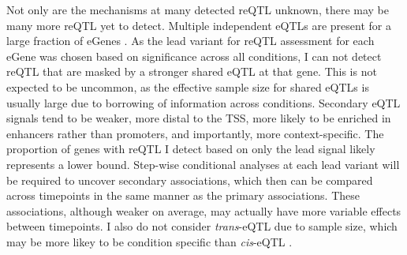 %

Not only are the mechanisms at many detected reQTL unknown, there may be many more reQTL yet to detect.
%
Multiple independent eQTLs are present for a large fraction of eGenes \autocite{zeng2019ComprehensiveMultipleEQTL}.
As the lead variant for reQTL assessment for each eGene was chosen based on significance across all conditions, I can not detect reQTL that are masked by a stronger shared eQTL at that gene.
This is not expected to be uncommon, as the effective sample size for shared eQTLs is usually large due to borrowing of information across conditions.
Secondary \gls{eQTL} signals tend to be weaker, more distal to the TSS, more likely to be enriched in enhancers rather than promoters, and importantly, more context-specific\autocite{vandiedonck2017GeneticAssociationMolecular,dobbyn2018LandscapeConditionalEQTL,rotival2019CharacterisingGeneticBasis}.
The proportion of genes with reQTL I detect based on only the lead signal likely represents a lower bound.
Step-wise conditional analyses at each lead variant will be required to uncover secondary associations, 
which then can be compared across timepoints in the same manner as the primary associations.
These associations, although weaker on average, may actually have more variable effects between timepoints.
I also do not consider \textit{trans}-\gls{eQTL} due to sample size, which may be more likey to be condition specific than \textit{cis}-\gls{eQTL} \autocite{fairfax2012GeneticsGeneExpression,westra2014GenomeFunctionStudying,fairfax2014InnateImmuneActivity}.

